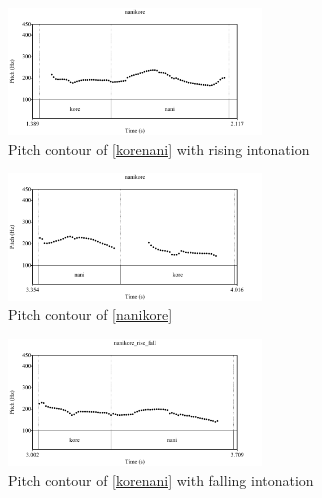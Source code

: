 \begin{figure}
	\begin{center}
	\includegraphics[width=0.6\textwidth]{sounds/korenani.pdf}
	\caption{Pitch contour of  \ref{korenani} with rising intonation}
	\label{korenaniF}
	\end{center}
\end{figure}
\begin{figure}
	\begin{center}
	\includegraphics[width=0.6\textwidth]{sounds/nanikore.pdf}
	\caption{Pitch contour of  \ref{nanikore}}
	\label{nanikoreF}
	\end{center}
\end{figure}
\begin{figure}
	\begin{center}
	\includegraphics[width=0.6\textwidth]{sounds/korenani_fall.pdf}
	\caption{Pitch contour of  \ref{korenani} with falling intonation}
	\label{korenani_fallF}
	\end{center}
\end{figure}
